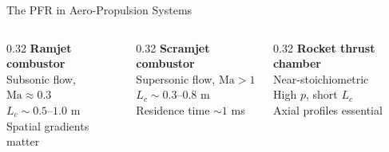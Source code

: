 \documentclass[12pt,aspectratio=169]{beamer}
\newcommand{\Ma}{\mathrm{Ma}}
\begin{document}
\begin{frame}{The PFR in Aero-Propulsion Systems}
\begin{center}
  \end{center}

  \medskip
  \begin{columns}
    \begin{column}{0.32\textwidth}
      \textbf{Ramjet combustor}\\
      Subsonic flow, $\Ma \approx 0.3$\\
      $L_c \sim 0.5$--$1.0$ m\\
      Spatial gradients matter
    \end{column}
    \begin{column}{0.32\textwidth}
      \textbf{Scramjet combustor}\\
      Supersonic flow, $\Ma > 1$\\
      $L_c \sim 0.3$--$0.8$ m\\
      Residence time $\sim 1$ ms
    \end{column}
    \begin{column}{0.32\textwidth}
      \textbf{Rocket thrust chamber}\\
      Near-stoichiometric\\
      High $p$, short $L_c$\\
      Axial profiles essential
    \end{column}
  \end{columns}
\end{frame}
\end{document}
